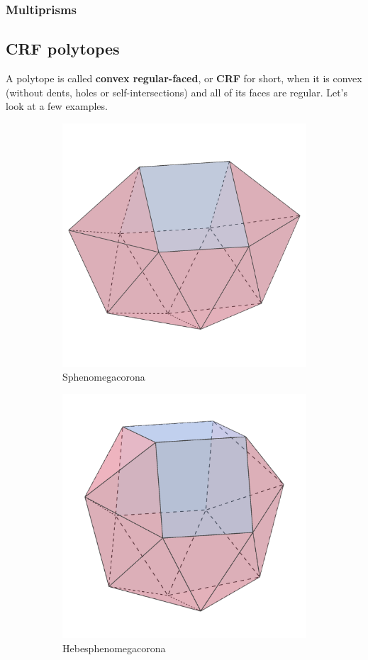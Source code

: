 \documentclass{article}
\begin{document}
\subsubsection{Multiprisms}

\subsection{CRF polytopes}
A polytope is called \textbf{convex regular-faced}, or \textbf{CRF} for short, when it is convex (without dents, holes or self-intersections) and all of its faces are regular. Let's look at a few examples.

\begin{figure}[h]
  \centering
  \begin{subfigure}{.33333\textwidth}
    \centering
    \includegraphics[width=.5\linewidth]{Sphenomegacorona}
    \caption{Sphenomegacorona}
    \label{fig:polyhedra_1}
  \end{subfigure}%
  \begin{subfigure}{.33333\textwidth}
    \centering
    \includegraphics[width=.5\linewidth]{Hebesphenomegacorona}
    \caption{Hebesphenomegacorona}
    \label{fig:polyhedra_2}
  \end{subfigure}%
  \begin{subfigure}{.33333\textwidth}

\end{subfigure}
\end{figure}
\end{document}
